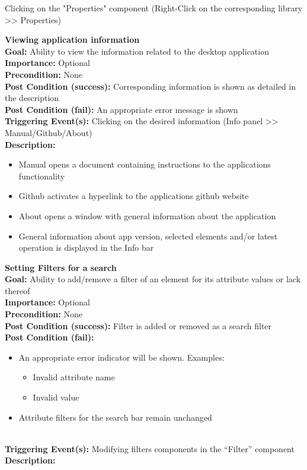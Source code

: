 \documentclass[10pt,a4paper]{report}
\newcommand{\precondition}[1]{
    \textbf{Precondition: } #1 \leavevmode \\
}
\newcommand{\FRODescription}[8]{
    \textbf{#1} \leavevmode \\
    \textbf{Goal: } #2 \leavevmode \\
    \textbf{Importance: } #3 \leavevmode \\
    \precondition{#4}
    \textbf{Post Condition (success): } #5 \leavevmode \\
    \textbf{Post Condition (fail): } #6 \leavevmode \\
    \textbf{Triggering Event(s): } #7 \leavevmode \\
    \textbf{Description: } \leavevmode \\
    #8}
\begin{document}
\begin{FRO}
    {Clicking on the "Properties" component (Right-Click on the corresponding library  >> Properties)}
    \item \FRODescription{Viewing application information\label{FRO-23}}
    {Ability to view the information related to the desktop application}
    {Optional}
    {None}
    {Corresponding information is shown as detailed in the description}
    {An appropriate error message is shown}
    {Clicking on the desired information (Info panel >> Manual/Github/About)}
    {\begin{itemize}
        \item Manual opens a document containing instructions to the applications functionality
        \item Github activates a hyperlink to the applications github website
        \item About opens a window with general information about the application
        \item General information about app version, selected elements and/or latest operation is displayed in the Info bar 
    \end{itemize}}
    \item \FRODescription{Setting Filters for a search\label{FRO-24}}
    {Ability to add/remove a filter of an element for its attribute values or lack thereof}
    {Optional}
    {None}
    {Filter is added or removed as a search filter}
    {\begin{itemize}
        \item An appropriate error indicator will be shown. Examples:
        \begin{itemize}
            \item Invalid attribute name
            \item Invalid value
        \end{itemize}
        \item Attribute filters for the search bar remain unchanged
    \end{itemize}}
    {Modifying filters components in the “Filter” component}

\end{FRO}
\end{document}
